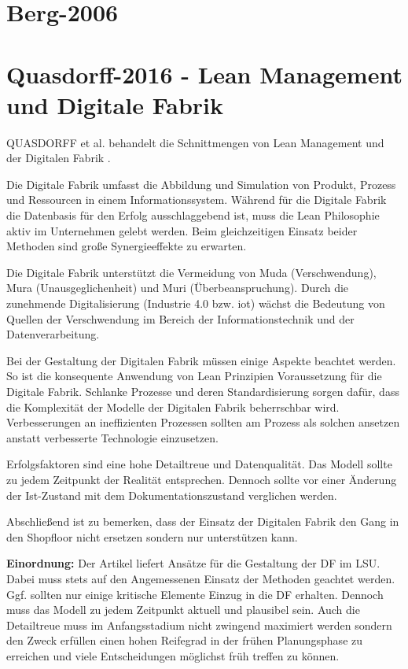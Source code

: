 \section{Berg-2006}

\section{Quasdorff-2016 - Lean Management und Digitale Fabrik}

QUASDORFF et al. behandelt die Schnittmengen von Lean Management und der Digitalen Fabrik \cite{Quasdorff2016}. 

Die Digitale Fabrik umfasst die Abbildung und Simulation von Produkt, Prozess und Ressourcen in einem Informationssystem. Während für die Digitale Fabrik die Datenbasis für den Erfolg ausschlaggebend ist, muss die Lean Philosophie aktiv im Unternehmen gelebt werden. Beim gleichzeitigen Einsatz beider Methoden sind große Synergieeffekte zu erwarten. 

Die Digitale Fabrik unterstützt die Vermeidung von Muda (Verschwendung), Mura (Unausgeglichenheit) und Muri (Überbeanspruchung). Durch die zunehmende Digitalisierung (Industrie 4.0 bzw. \gls{iot}) wächst die Bedeutung von Quellen der Verschwendung im Bereich der Informationstechnik und der Datenverarbeitung. 

Bei der Gestaltung der Digitalen Fabrik müssen einige Aspekte beachtet werden. So ist die konsequente Anwendung von Lean Prinzipien Voraussetzung für die Digitale Fabrik. Schlanke Prozesse und deren Standardisierung sorgen dafür, dass die Komplexität der Modelle der Digitalen Fabrik beherrschbar wird. 
Verbesserungen an ineffizienten Prozessen sollten am Prozess als solchen ansetzen anstatt verbesserte Technologie einzusetzen. %

Erfolgsfaktoren sind eine hohe Detailtreue und Datenqualität. Das Modell sollte zu jedem Zeitpunkt der Realität entsprechen. Dennoch sollte vor einer Änderung der Ist-Zustand mit dem Dokumentationszustand verglichen werden. 

Abschließend ist zu bemerken, dass der Einsatz der Digitalen Fabrik den Gang in den Shopfloor nicht ersetzen sondern nur unterstützen kann. 

\textbf{Einordnung:} Der Artikel liefert Ansätze für die Gestaltung der DF im LSU. Dabei muss stets auf den Angemessenen Einsatz der Methoden geachtet werden. Ggf. sollten nur einige kritische Elemente Einzug in die DF erhalten. Dennoch muss das Modell zu jedem Zeitpunkt aktuell und plausibel sein. Auch die Detailtreue muss im Anfangsstadium nicht zwingend maximiert werden sondern den Zweck erfüllen einen hohen Reifegrad in der frühen Planungsphase zu erreichen und viele Entscheidungen möglichst früh treffen zu können. 

